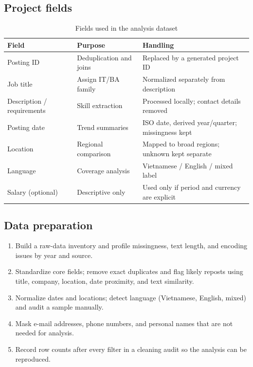 \documentclass[12pt,a4paper]{article}
\begin{document}
\subsection{Project fields}

\begin{table}[H]
\centering\small
\caption{Fields used in the analysis dataset}
\label{tab:fields}
\begin{tabularx}{\textwidth}{@{}P{3.4cm}P{4.2cm}L@{}}
\toprule
\textbf{Field} & \textbf{Purpose} & \textbf{Handling} \\
\midrule
Posting ID & Deduplication and joins & Replaced by a generated project ID \\
Job title & Assign IT/BA family & Normalized separately from description \\
Description / requirements & Skill extraction & Processed locally; contact
  details removed \\
Posting date & Trend summaries & ISO date, derived year/quarter; missingness kept \\
Location & Regional comparison & Mapped to broad regions; unknown kept separate \\
Language & Coverage analysis & Vietnamese / English / mixed label \\
Salary (optional) & Descriptive only & Used only if period and currency are explicit \\
\bottomrule
\end{tabularx}
\end{table}

\subsection{Data preparation}
\begin{enumerate}
  \item Build a raw-data inventory and profile missingness, text length, and
        encoding issues by year and source.
  \item Standardize core fields; remove exact duplicates and flag likely
        reposts using title, company, location, date proximity, and text
        similarity.
  \item Normalize dates and locations; detect language (Vietnamese, English,
        mixed) and audit a sample manually.
  \item Mask e-mail addresses, phone numbers, and personal names that are not
        needed for analysis.
  \item Record row counts after every filter in a cleaning audit so the
        analysis can be reproduced.
\end{enumerate}
\end{document}
